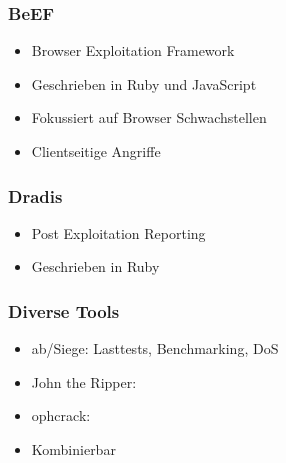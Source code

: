 \documentclass[11pt]{beamer}
\begin{document}
\begin{frame}[fragile]\frametitle{BeEF}
\label{sec-2-9}
\begin{itemize}

\item Browser Exploitation Framework\\
\label{sec-2-9-1}%
\item Geschrieben in Ruby und JavaScript\\
\label{sec-2-9-2}%
\item Fokussiert auf Browser Schwachstellen\\
\label{sec-2-9-3}%
\item Clientseitige Angriffe\\
\label{sec-2-9-4}%
\end{itemize} %
\end{frame}
\begin{frame}[fragile]\frametitle{Dradis}
\label{sec-2-10}
\begin{itemize}

\item Post Exploitation Reporting\\
\label{sec-2-10-1}%
\item Geschrieben in Ruby\\
\label{sec-2-10-2}%
\end{itemize} %
\end{frame}
\begin{frame}[fragile]\frametitle{Diverse Tools}
\label{sec-2-11}
\begin{itemize}

\item ab/Siege: Lasttests, Benchmarking, DoS\\
\label{sec-2-11-1}%
\item John the Ripper:\\
\label{sec-2-11-2}%
\item ophcrack:\\
\label{sec-2-11-3}%
\item Kombinierbar\\
\label{sec-2-11-4}%
\end{itemize} %
\end{frame}
\end{document}
